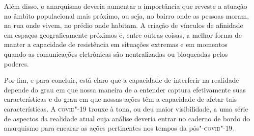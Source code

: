 Além disso, o anarquismo deveria aumentar a importância que reveste a
atuação no âmbito populacional mais próximo, ou seja, no bairro onde as
pessoas moram, na rua onde vivem, no prédio onde habitam. A criação de
vínculos de afinidade em espaços geograficamente próximos é, entre
outras coisas, a melhor forma de manter a capacidade de resistência em
situações extremas e em momentos quando as comunicações eletrônicas são
neutralizadas ou bloqueadas pelos poderes.

Por fim, e para concluir, está claro que a capacidade de interferir na
realidade depende do grau em que nossa maneira de a entender captura
efetivamente suas características e do grau em que nossas ações têm a
capacidade de afetar tais características. A \textsc{covid}"-19 trouxe à tona, ou
deu maior visibilidade, a uma série de aspectos da realidade atual cuja
análise deveria entrar no caderno de bordo do anarquismo para encarar as
ações pertinentes nos tempos da pós"-\textsc{covid}"-19.



